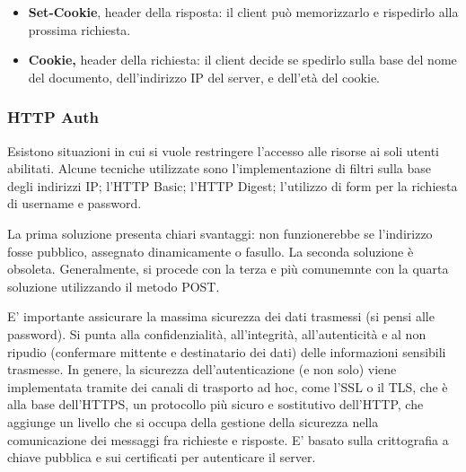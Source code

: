             \begin{itemize}
                \item
                \textbf{Set-Cookie}, header della risposta: il client può memorizzarlo e rispedirlo alla prossima richiesta.
                
                \item
                \textbf{Cookie,} header della richiesta: il client decide
                se spedirlo sulla base del nome del documento, dell’indirizzo IP del server, e dell’età del cookie.
            \end{itemize}
        
        \subsubsection{HTTP Auth}
        
            Esistono situazioni in cui si vuole restringere l’accesso alle risorse ai soli utenti abilitati. Alcune tecniche utilizzate sono l'implementazione di filtri sulla base degli indirizzi IP; l'HTTP Basic; l'HTTP Digest; l'utilizzo di form per la richiesta di username e password.
            
            \vspace{3mm}
            
            La prima soluzione presenta chiari svantaggi: non funzionerebbe se l'indirizzo fosse pubblico, assegnato dinamicamente o fasullo. La seconda soluzione è obsoleta. Generalmente, si procede con la terza e più comunemnte con la quarta soluzione utilizzando il metodo POST.
            
            \vspace{3mm}
            
            E' importante assicurare la massima sicurezza dei dati trasmessi (si pensi alle password). Si punta alla confidenzialità, all'integrità, all'autenticità e al non ripudio (confermare mittente e destinatario dei dati) delle informazioni sensibili trasmesse. In genere, la sicurezza dell'autenticazione (e non solo) viene implementata tramite dei canali di trasporto ad hoc, come l'SSL o il TLS, che è alla base dell'HTTPS, un protocollo più sicuro e sostitutivo dell'HTTP, che aggiunge un livello che si occupa della gestione della sicurezza nella comunicazione dei messaggi fra richieste e risposte. E' basato sulla crittografia a chiave pubblica e sui certificati per autenticare il server.
            
            \vspace{3mm}
            

